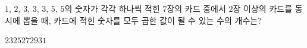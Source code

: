 \hspace*{2mm}\begin{minipage}[t]{\dimexpr\linewidth-2mm\relax}\vspace{0pt}
$1$, $2$, $3$, $3$, $3$, $5$, $5$의 숫자가 각각 하나씩 적힌 $7$장의 카드 중에서 $2$장 이상의 카드를 동시에 뽑을 때, 카드에 적힌 숫자를 모두 곱한 값이 될 수 있는 수의 개수는?
\begin{choices32}{$23$}{$25$}{$27$}{$29$}{$31$}\end{choices32}\end{minipage}
